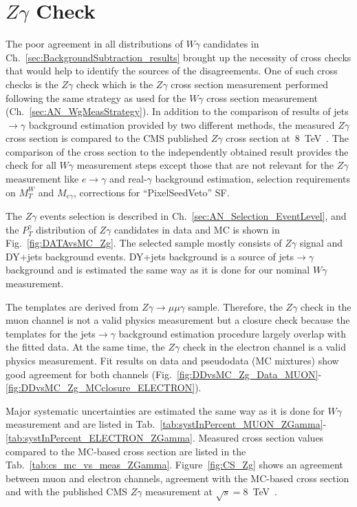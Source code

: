 \chapter{$Z\gamma$ Check}
\label{sec:ZgCheck}

The poor agreement in all distributions of $W\gamma$ candidates in Ch.~\ref{sec:BackgroundSubtraction_results} brought up the necessity of cross checks that would help to identify the sources of the disagreements. One of such cross checks is the $Z\gamma$ check which is the $Z\gamma$ cross section measurement performed following the same strategy as used for the $W\gamma$ cross section measurement (Ch.~\ref{sec:AN_WgMeasStrategy}). In addition to the comparison of results of jets$\rightarrow\gamma$ background estimation provided by two different methods, the measured $Z\gamma$ cross section is compared to the CMS published $Z\gamma$ cross section at~8~TeV~\cite{ref_Zg8TeV}. The comparison of the cross section to the independently obtained result provides the check for all $W\gamma$ measurement steps except those that are not relevant for the $Z\gamma$ measurement like $e\rightarrow\gamma$ and real-$\gamma$ background estimation, selection requirements on $M_T^W$ and $M_{e\gamma}$, corrections for ``PixelSeedVeto'' SF. 

The $Z\gamma$ events selection is described in Ch.~\ref{sec:AN_Selection_EventLevel}, and the $P_T^{\gamma}$ distribution of $Z\gamma$ candidates in data and MC is shown in Fig.~\ref{fig:DATAvsMC_Zg}. The selected sample mostly consists of $Z\gamma$ signal and DY+jets background events. DY+jets background is a source of jets$\rightarrow\gamma$ background and is estimated the same way as it is done for our nominal $W\gamma$ measurement.  

The templates are derived from $Z\gamma\rightarrow\mu\mu\gamma$ sample. Therefore, the $Z\gamma$ check in the muon channel is not a valid physics measurement but a closure check because the templates for the jets$\rightarrow\gamma$ background estimation procedure largely overlap with the fitted data. At the same time, the $Z\gamma$ check in the electron channel is a valid physics measurement. Fit results on data and pseudodata (MC mixtures) show good agreement for both channels (Fig.~\ref{fig:DDvsMC_Zg_Data_MUON}-\ref{fig:DDvsMC_Zg_MCclosure_ELECTRON}). %

Major systematic uncertainties are estimated the same way as it is done for $W\gamma$ measurement and are listed in Tab.~\ref{tab:systInPercent_MUON_ZGamma}-\ref{tab:systInPercent_ELECTRON_ZGamma}. Measured cross section values compared to the MC-based cross section are listed in the Tab.~\ref{tab:cs_mc_vs_meas_ZGamma}. Figure~\ref{fig:CS_Zg} shows an agreement between muon and electron channels, agreement with the MC-based cross section and with the published CMS $Z\gamma$ measurement at $\sqrt{s}=$8~TeV~\cite{ref_Zg8TeV}.


